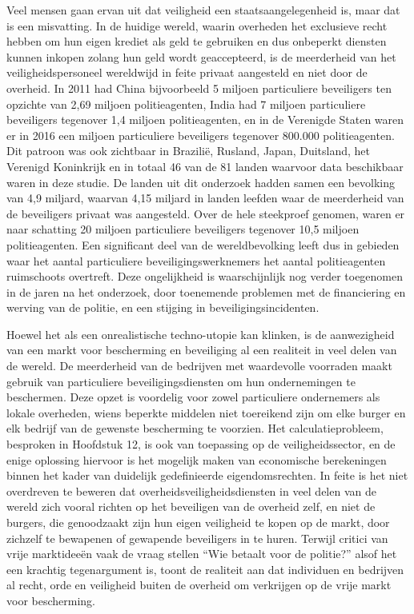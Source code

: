 Veel mensen gaan ervan uit dat veiligheid een staatsaangelegenheid is, maar dat is een misvatting. In de huidige wereld, waarin overheden het exclusieve recht hebben om hun eigen krediet als geld te gebruiken en dus onbeperkt diensten kunnen inkopen zolang hun geld wordt geaccepteerd, is de meerderheid van het veiligheidspersoneel wereldwijd in feite privaat aangesteld en niet door de overheid. In 2011 had China bijvoorbeeld 5 miljoen particuliere beveiligers ten opzichte van 2,69 miljoen politieagenten, India had 7 miljoen particuliere beveiligers tegenover 1,4 miljoen politieagenten, en in de Verenigde Staten waren er in 2016 een miljoen particuliere beveiligers tegenover 800.000 politieagenten. Dit patroon was ook zichtbaar in Brazilië, Rusland, Japan, Duitsland, het Verenigd Koninkrijk en in totaal 46 van de 81 landen waarvoor data beschikbaar waren in deze studie. De landen uit dit onderzoek hadden samen een bevolking van 4,9 miljard, waarvan 4,15 miljard in landen leefden waar de meerderheid van de beveiligers privaat was aangesteld. Over de hele steekproef genomen, waren er naar schatting 20 miljoen particuliere beveiligers tegenover 10,5 miljoen politieagenten. Een significant deel van de wereldbevolking leeft dus in gebieden waar het aantal particuliere beveiligingswerknemers het aantal politieagenten ruimschoots overtreft. Deze ongelijkheid is waarschijnlijk nog verder toegenomen in de jaren na het onderzoek, door toenemende problemen met de financiering en werving van de politie, en een stijging in beveiligingsincidenten.\autocite{198}

Hoewel het als een onrealistische techno-utopie kan klinken, is de aanwezigheid van een markt voor bescherming en beveiliging al een realiteit in veel delen van de wereld. De meerderheid van de bedrijven met waardevolle voorraden maakt gebruik van particuliere beveiligingsdiensten om hun ondernemingen te beschermen. Deze opzet is voordelig voor zowel particuliere ondernemers als lokale overheden, wiens beperkte middelen niet toereikend zijn om elke burger en elk bedrijf van de gewenste bescherming te voorzien. Het calculatieprobleem, besproken in Hoofdstuk 12, is ook van toepassing op de veiligheidssector, en de enige oplossing hiervoor is het mogelijk maken van economische berekeningen binnen het kader van duidelijk gedefinieerde eigendomsrechten. In feite is het niet overdreven te beweren dat overheidsveiligheidsdiensten in veel delen van de wereld zich vooral richten op het beveiligen van de overheid zelf, en niet de burgers, die genoodzaakt zijn hun eigen veiligheid te kopen op de markt, door zichzelf te bewapenen of gewapende beveiligers in te huren. Terwijl critici van vrije marktideeën vaak de vraag stellen ``Wie betaalt voor de politie?'' alsof het een krachtig tegenargument is, toont de realiteit aan dat individuen en bedrijven al recht, orde en veiligheid buiten de overheid om verkrijgen op de vrije markt voor bescherming.

